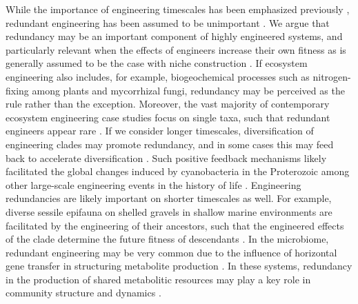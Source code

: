 \documentclass[twocolumn,preprintnumbers,amsmath,amssymb,superscriptaddress,linenumbers]{revtex4-1}
\begin{document}
While the importance of engineering timescales has been emphasized previously \cite{Hastings2007}, redundant engineering has been assumed to be unimportant \cite{Lawton1994}.
We argue that redundancy may be an important component of highly engineered systems, and particularly relevant when the effects of engineers increase their own fitness \cite{Cuddington2004} as is generally assumed to be the case with niche construction \cite{Krakauer2009}.
If ecosystem engineering also includes, for example, biogeochemical processes such as nitrogen-fixing among plants and mycorrhizal fungi, redundancy may be perceived as the rule rather than the exception.
Moreover, the vast majority of contemporary ecosystem engineering case studies focus on single taxa, such that redundant engineers appear rare \cite{Lawton1994}.
If we consider longer timescales, diversification of engineering clades may promote redundancy, and in some cases this may feed back to accelerate diversification \cite{OdlingSmee2013b}.
Such positive feedback mechanisms likely facilitated the global changes induced by cyanobacteria in the Proterozoic \cite{Erwin2008,Schirrmeister2013} among other large-scale engineering events in the history of life \cite{Erwin2008}.
Engineering redundancies are likely important on shorter timescales as well.
For example, diverse sessile epifauna on shelled gravels in shallow marine environments are facilitated by the engineering of their ancestors, such that the engineered effects of the clade determine the future fitness of descendants \cite{Kidwell1986}.
In the microbiome, redundant engineering may be very common due to the influence of horizontal gene transfer in structuring metabolite production \cite{Polz2013}.
In these systems, redundancy in the production of shared metabolitic resources may play a key role in community structure and dynamics \cite{Kallus2017,Butler2018}.
\end{document}
